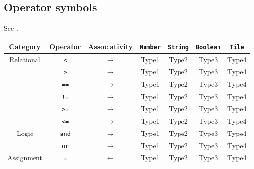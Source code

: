 \subsection{Operator symbols}
See .

\begin{table}[h!]
    \centering
    \begin{tabular}{ |c|c|c||c|c|c|c| }
        \hline
        \textbf{Category} & \textbf{Operator} & \textbf{Associativity} & \texttt{Number} & \texttt{String} & \texttt{Boolean} & \texttt{Tile} \\                              
        \hline

        \multirow{6}{*}{Relational} 
        & \texttt{<}
        & $\rightarrow$ 
        & Type1 
        & Type2 
        & Type3 
        & Type4 
        \\
        
         
        & \texttt{>} 
        & $\rightarrow$ 
        & Type1 
        & Type2 
        & Type3 
        & Type4 
        \\

        
        & \texttt{==} 
        & $\rightarrow$ 
        & Type1 
        & Type2 
        & Type3 
        & Type4 
        \\

         
        & \texttt{!=} 
        & $\rightarrow$ 
        & Type1 
        & Type2 
        & Type3 
        & Type4 
        \\

         
        & \texttt{>=} 
        & $\rightarrow$ 
        & Type1 
        & Type2 
        & Type3 
        & Type4 
        \\

         
        & \texttt{<=} 
        & $\rightarrow$ 
        & Type1 
        & Type2 
        & Type3 
        & Type4 
        \\\hline

        \multirow{2}{*}{Logic}
        & \texttt{and} 
        & $\rightarrow$ 
        & Type1 
        & Type2 
        & Type3 
        & Type4 
        \\
 
        & \texttt{or} 
        & $\rightarrow$ 
        & Type1 
        & Type2 
        & Type3 
        & Type4 
        \\\hline
        
        Assignment 
        & \texttt{=}
        & $\leftarrow$ 
        & Type1 
        & Type2 
        & Type3 
        & Type4 
        \\\hline
        

\end{tabular}
\end{table}
